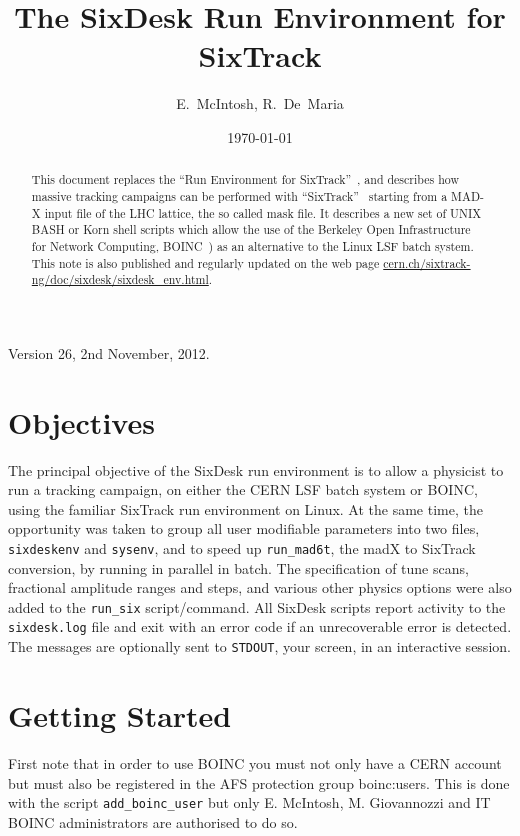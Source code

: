 \documentclass{cernatsnote}
\newcommand{\myhref}[2]{\href{#1}{\color{blue}#2}}
\begin{document}
\begin{titlepage}
\ifx \WEB \undefined
{}
\fi
\date{\today}
\title{The SixDesk Run Environment for SixTrack}
\author{E.~McIntosh, R.~De~Maria}
\ifx \WEB \undefined
{}
\fi

\maketitle

\ifx \WEB \undefined
 \begin{abstract}
 \fi
This document replaces the ``Run Environment for SixTrack''~\cite{Runsix}, and
describes how massive tracking campaigns can be performed with
``SixTrack''~\cite{SixTrack} starting from a MAD-X input file of the LHC
lattice, the so called mask file. It describes a new set of UNIX BASH or Korn
shell scripts which allow the use of the Berkeley Open Infrastructure for
Network Computing, BOINC~\cite{Boinc}) as an alternative to the Linux LSF batch
system. This note is also published and regularly updated on the web page
\myhref{http://cern.ch/sixtrack-ng/doc/sixdesk/sixdesk_env.html}{cern.ch/sixtrack-ng/doc/sixdesk/sixdesk\_env.html}.
\ifx \WEB \undefined
\end{abstract}
\fi

\end{titlepage}
%
Version 26, 2nd November, 2012.

\section{Objectives}
%
The principal objective of the SixDesk run environment is to allow a physicist
to run a tracking campaign, on either the CERN LSF batch system or BOINC, using
the familiar SixTrack run environment on Linux.  At the same time, the
opportunity was taken to group all user modifiable parameters into two files,
{\tt sixdeskenv} and {\tt sysenv}, and to speed up {\tt run\_mad6t}, the madX
to SixTrack conversion, by running in parallel in batch.  The specification of
tune scans, fractional amplitude ranges and steps, and various other physics
options were also added to the {\tt run\_six} script/command.  All SixDesk
scripts report activity to the {\tt sixdesk.log} file and exit with an error
code if an unrecoverable error is detected.  The messages are optionally sent
to {\tt STDOUT}, your screen, in an interactive session.
%
\section{Getting Started} First note that in order to use BOINC you must not
only have a CERN account but must also be registered in the AFS protection
group boinc:users. This is done with the script {\tt add\_boinc\_user} but only
E. McIntosh, M. Giovannozzi and IT BOINC administrators are authorised to do
so.
\end{document}
